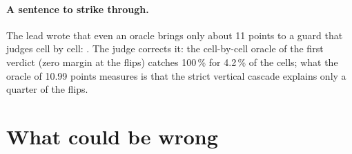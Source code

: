 \paragraph{A sentence to strike through.} The lead wrote that even an oracle brings only about 11 points to a guard that judges cell by cell: . The judge corrects it: the cell-by-cell oracle of the first verdict (zero margin at the flips) catches 100\,\% for 4.2\,\% of the cells; what the oracle of 10.99 points measures is that the strict vertical cascade explains only a quarter of the flips.

\section{What could be wrong}\label{t3tro:sec:faux}

